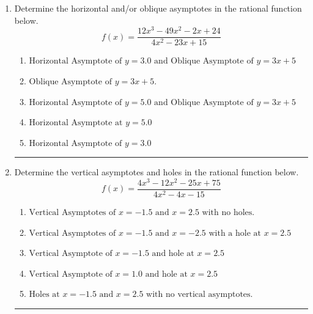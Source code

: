 \documentclass[14pt]{extbook}
\newcommand{\litem}[1]{\item#1\hspace*{-1cm}\rule{\textwidth}{0.4pt}}
\begin{document}
\begin{enumerate}
{\begin{enumerate}[label=\Alph*.]
\end{enumerate} }
\litem{
Determine the horizontal and/or oblique asymptotes in the rational function below.\[ f(x) = \frac{12x^{3} -49 x^{2} -2 x + 24}{4x^{2} -23 x + 15} \]\begin{enumerate}[label=\Alph*.]
\item \( \text{Horizontal Asymptote of } y = 3.0 \text{ and Oblique Asymptote of } y = 3x + 5 \)
\item \( \text{Oblique Asymptote of } y = 3x + 5. \)
\item \( \text{Horizontal Asymptote of } y = 5.0 \text{ and Oblique Asymptote of } y = 3x + 5 \)
\item \( \text{Horizontal Asymptote at } y = 5.0 \)
\item \( \text{Horizontal Asymptote of } y = 3.0  \)

\end{enumerate} }
\litem{
Determine the vertical asymptotes and holes in the rational function below.\[ f(x) = \frac{4x^{3} -12 x^{2} -25 x + 75}{4x^{2} -4 x -15} \]\begin{enumerate}[label=\Alph*.]
\item \( \text{Vertical Asymptotes of } x = -1.5 \text{ and } x = 2.5 \text{ with no holes.} \)
\item \( \text{Vertical Asymptotes of } x = -1.5 \text{ and } x = -2.5 \text{ with a hole at } x = 2.5 \)
\item \( \text{Vertical Asymptote of } x = -1.5 \text{ and hole at } x = 2.5 \)
\item \( \text{Vertical Asymptote of } x = 1.0 \text{ and hole at } x = 2.5 \)
\item \( \text{Holes at } x = -1.5 \text{ and } x = 2.5 \text{ with no vertical asymptotes.} \)

\end{enumerate} }
\end{enumerate}
\end{document}
